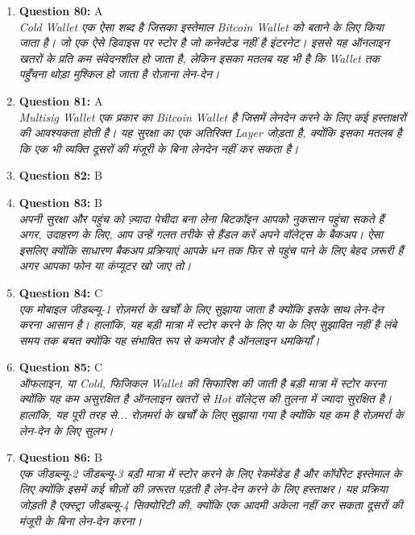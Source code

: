 \documentclass[12pt,a4paper]{article}
\begin{document}
\begin{enumerate}
\item \textbf{Question 80:} A
\\ \textit{Cold Wallet एक ऐसा शब्द है जिसका इस्तेमाल Bitcoin Wallet को बताने के लिए किया जाता है। जो एक ऐसे डिवाइस पर स्टोर है जो कनेक्टेड नहीं है इंटरनेट। इससे यह ऑनलाइन खतरों के प्रति कम संवेदनशील हो जाता है, लेकिन इसका मतलब यह भी है कि Wallet तक पहुँचना थोड़ा मुश्किल हो जाता है रोज़ाना लेन-देन।}

\item \textbf{Question 81:} A
\\ \textit{Multisig Wallet एक प्रकार का Bitcoin Wallet है जिसमें लेनदेन करने के लिए कई हस्ताक्षरों की आवश्यकता होती है। यह सुरक्षा का एक अतिरिक्त Layer जोड़ता है, क्योंकि इसका मतलब है कि एक भी व्यक्ति दूसरों की मंजूरी के बिना लेनदेन नहीं कर सकता है।}

\item \textbf{Question 82:} B

\item \textbf{Question 83:} B
\\ \textit{अपनी सुरक्षा और पहुंच को ज़्यादा पेचीदा बना लेना बिटकॉइन आपको नुकसान पहुंचा सकते हैं अगर, उदाहरण के लिए, आप उन्हें गलत तरीके से हैंडल करें अपने वॉलेट्स के बैकअप। ऐसा इसलिए क्योंकि साधारण बैकअप प्रक्रियाएं आपके धन तक फिर से पहुंच पाने के लिए बेहद ज़रूरी हैं अगर आपका फोन या कंप्यूटर खो जाए तो।}

\item \textbf{Question 84:} C
\\ \textit{एक मोबाइल जीडब्ल्यू-1 रोज़मर्रा के खर्चों के लिए सुझाया जाता है क्योंकि इसके साथ लेन-देन करना आसान है। हालांकि, यह बड़ी मात्रा में स्टोर करने के लिए या के लिए सुझावित नहीं है लंबे समय तक बचत क्योंकि यह संभावित रूप से कमजोर है ऑनलाइन धमकियाँ।}

\item \textbf{Question 85:} C
\\ \textit{ऑफलाइन, या Cold, फिजिकल Wallet की सिफारिश की जाती है बड़ी मात्रा में स्टोर करना क्योंकि यह कम असुरक्षित है ऑनलाइन खतरों से Hot वॉलेट्स की तुलना में ज्यादा सुरक्षित है। हालांकि, यह पूरी तरह से... रोज़मर्रा के खर्चों के लिए सुझाया गया है क्योंकि यह कम है रोज़मर्रा के लेन-देन के लिए सुलभ।}

\item \textbf{Question 86:} B
\\ \textit{एक जीडब्ल्यू-2 जीडब्ल्यू-3 बड़ी मात्रा में स्टोर करने के लिए रेकमेंडेड है और कॉर्पोरेट इस्तेमाल के लिए क्योंकि इसमें कई चीज़ों की ज़रूरत पड़ती है लेन-देन करने के लिए हस्ताक्षर। यह प्रक्रिया जोड़ती है एक्स्ट्रा जीडब्ल्यू-4 सिक्योरिटी की, क्योंकि एक आदमी अकेला नहीं कर सकता दूसरों की मंजूरी के बिना लेन-देन करना।}


\end{enumerate}
\end{document}
